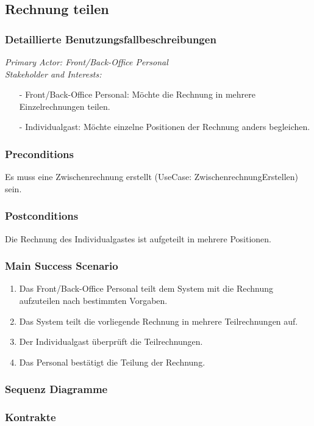 \documentclass[./detailed_overview_usecases.tex]{subfiles}
\begin{document}
    \subsection{Rechnung teilen}
    \subsubsection{Detaillierte Benutzungsfallbeschreibungen}
    \textit{Primary Actor: Front/Back-Office Personal}
    \\
    \textit{Stakeholder and Interests:}
    \begin{itemize}
        \item[-] Front/Back-Office Personal: Möchte die Rechnung in mehrere Einzelrechnungen teilen.
        \item[-] Individualgast: Möchte einzelne Positionen der Rechnung anders begleichen.
    \end{itemize}

    \subsubsection*{Preconditions}
    Es muss eine Zwischenrechnung erstellt (UseCase: ZwischenrechnungErstellen) sein.

    \subsubsection*{Postconditions}
    Die Rechnung des Individualgastes ist aufgeteilt in mehrere Positionen.

    \subsubsection*{Main Success Scenario}
    \begin{enumerate}
        \item Das Front/Back-Office Personal teilt dem System mit die Rechnung aufzuteilen nach bestimmten Vorgaben.
        \item Das System teilt die vorliegende Rechnung in mehrere Teilrechnungen auf.
        \item Der Individualgast überprüft die Teilrechnungen.
        \item Das Personal bestätigt die Teilung der Rechnung.
    \end{enumerate}
    \subsubsection{Sequenz Diagramme}
    \subsubsection{Kontrakte}
\end{document}
